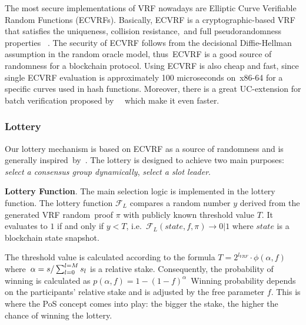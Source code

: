 The most secure implementations of VRF nowadays are Elliptic Curve Verifiable Random Functions (ECVRFs).
Basically, ECVRF is a cryptographic-based VRF that satisfies the uniqueness, collision resistance,\
and full pseudorandomness properties ~\cite{cryptoeprint:2014/905}.
The security of ECVRF follows from the decisional Diffie-Hellman assumption in the random oracle model, thus\
ECVRF is a good source of randomness for a blockchain protocol.
Using ECVRF is also cheap and fast, since single ECVRF evaluation is approximately 100 microseconds on\
x86-64 for a specific curves used in hash functions.
Moreover, there is a great UC-extension for batch verification proposed by ~\cite{cryptoeprint:2022/1045}\
which make it even faster.

\subsubsection{Lottery}
Our lottery mechanism is based on ECVRF as a source of randomness and is generally inspired\
by~\cite{cryptoeprint:2017/573}.
The lottery is designed to achieve two main purposes: \emph{select a consensus group dynamically},
\emph{select a slot leader}.

\textbf{Lottery Function}.
The main selection logic is implemented in the lottery function.
The lottery function ${\mathcal{F}}_{L}$ compares a random number $y$ derived from the generated VRF random\
proof $\pi$ with publicly known threshold value $T$.
It evaluates to $1$ if and only if ${y < T}$, i.e.\
${\mathcal{F}}_{L}(state, f, \pi) \rightarrow 0|1$ where $state$ is a blockchain state snapshot.

The threshold value is calculated according to the formula ${T = 2^{l_{VRF}}\cdot \phi(\alpha, f)}$ where\
${\alpha=s/\\\sum_{l=0}^{l=M} s_l}$ is a relative stake.
Consequently, the probability of winning is calculated as ${p(\alpha, f) = 1-(1-f)^{\alpha}}$\
Winning probability depends on the participants' relative stake and is adjusted by the free parameter $f$.
This is where the PoS concept comes into play: the bigger the stake, the higher the chance of winning the lottery.

